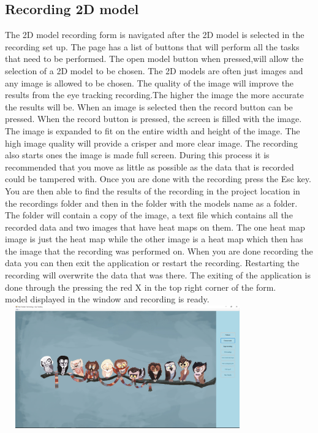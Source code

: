 \subsection{Recording 2D model}
The 2D model recording form is navigated after the 2D model is selected in the recording set up. The page has a list of buttons that will perform all the tasks that need to be performed. The open model button when pressed,will allow the selection of a 2D model to be chosen. The 2D models are often just images and any image is allowed to be chosen. The quality of the image will improve the results from the eye tracking recording.The higher the image the more accurate the results will be. When an image is selected then the record button can be pressed. When the record button is pressed, the screen is filled with the image. The image is expanded to fit on the entire width and height of the image. The high image quality will provide a crisper and more clear image. The recording also starts ones the image is made full screen. During this process it is recommended that you move as little as possible as the data that is recorded could be tampered with. Once you are done with the recording press the Esc key. You are then able to find the results of the recording in the project location in the recordings folder and then in the folder with the models name as a folder. The folder will contain a copy of the image, a text file which contains all the recorded data and two images that have heat maps on them. The one heat map image is just the heat map while the other image is a heat map which then has the image that the recording was performed on. When you are done recording the data you can then exit the application or restart the recording. Restarting the recording will overwrite the data that was there. The exiting of the application is done through the pressing the red X in the top right corner of the form.\\

model displayed in the window and recording is ready.\\

\includegraphics[width=400px,height=200px]{./Images/ModelPreview.PNG}\\


